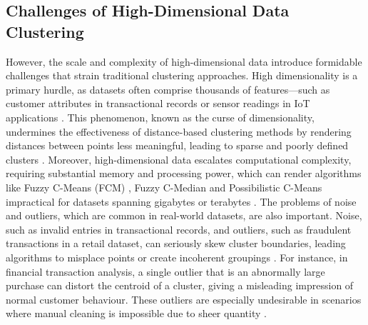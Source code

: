 \documentclass[twoside,11pt]{article}
\renewcommand{\cite}{\citep}
\begin{document}
\subsection{Challenges of High-Dimensional Data Clustering}
However, the scale and complexity of high-dimensional data introduce formidable challenges that strain traditional clustering approaches. High dimensionality is a primary hurdle, as datasets often comprise thousands of features—such as customer attributes in transactional records or sensor readings in IoT applications \cite{manakkadu2024}. This phenomenon, known as the curse of dimensionality, undermines the effectiveness of distance-based clustering methods by rendering distances between points less meaningful, leading to sparse and poorly defined clusters \cite{zong2020}. Moreover, high-dimensional data escalates computational complexity, requiring substantial memory and processing power, which can render algorithms like Fuzzy C-Means (FCM) \cite{bezdek1984}\cite{hashemi2023}, Fuzzy C-Median \cite{yu2004}\cite{mallik2024} and Possibilistic C-Means \cite{krishnapuram1993}\cite{mallik2021} impractical for datasets spanning gigabytes or terabytes \cite{pal1995}.
The problems of noise and outliers, which are common in real-world datasets, are also important. Noise, such as invalid entries in transactional records, and outliers, such as fraudulent transactions in a retail dataset, can seriously skew cluster boundaries, leading algorithms to misplace points or create incoherent groupings \cite{zhang2019}. For instance, in financial transaction analysis, a single outlier that is an abnormally large purchase can distort the centroid of a cluster, giving a misleading impression of normal customer behaviour. These outliers are especially undesirable in scenarios where manual cleaning is impossible due to sheer quantity \cite{amil2019}.
\end{document}
